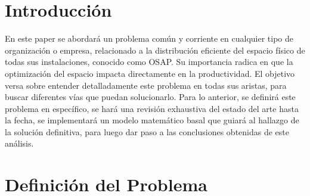 \documentclass[letter, 10pt]{article}
\begin{document}
\section{Introducci\'on}

En este paper se abordar\'a un problema com\'un y corriente en cualquier tipo de organizaci\'on o empresa, relacionado a la distribuci\'on eficiente del espacio f\'isico de todas sus instalaciones, conocido como OSAP. Su importancia radica en que la optimizaci\'on del espacio impacta directamente en la productividad. El objetivo versa sobre entender detalladamente este problema en todas sus aristas, para buscar diferentes v\'ias que puedan solucionarlo. Para lo anterior, se definir\'a este problema en espec\'ifico, se har\'a una revisi\'on exhaustiva del estado del arte hasta la fecha, se implementar\'a un modelo matem\'atico basal que guiar\'a al hallazgo de la soluci\'on definitiva, para luego dar paso a las conclusiones obtenidas de este an\'alisis.


\section{Definici\'on del Problema}
\end{document}
